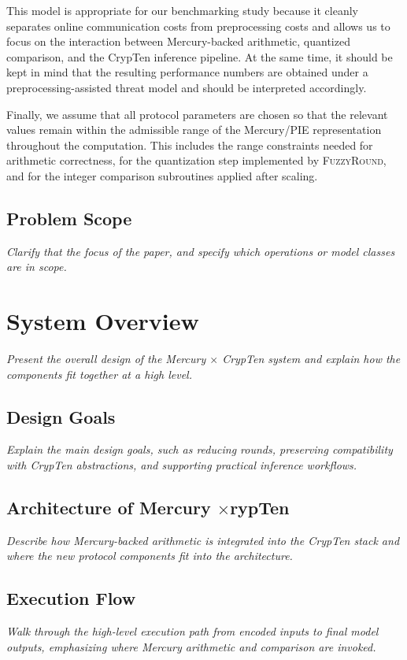 This model is appropriate for our benchmarking study because it cleanly
separates online communication costs from preprocessing costs and
allows us to focus on the interaction between Mercury-backed arithmetic,
quantized comparison, and the CrypTen inference pipeline. At the same
time, it should be kept in mind that the resulting performance numbers
are obtained under a preprocessing-assisted threat model and should be
interpreted accordingly.

Finally, we assume that all protocol parameters are chosen so that the
relevant values remain within the admissible range of the Mercury/PIE
representation throughout the computation. This includes the range
constraints needed for arithmetic correctness, for the quantization
step implemented by \textsc{FuzzyRound}, and for the integer comparison
subroutines applied after scaling.

\subsection{Problem Scope}
\textit{Clarify that the focus of the paper, and specify which operations or model classes are in scope.}

\section{System Overview}
\textit{Present the overall design of the Mercury $\times$ CrypTen system and explain how the components fit together at a high level.}

\subsection{Design Goals}
\textit{Explain the main design goals, such as reducing rounds, preserving compatibility with CrypTen abstractions, and supporting practical inference workflows.}

\subsection{Architecture of Mercury \texorpdfstring{$\times$} CrypTen}
\textit{Describe how Mercury-backed arithmetic is integrated into the CrypTen stack and where the new protocol components fit into the architecture.}

\subsection{Execution Flow}
\textit{Walk through the high-level execution path from encoded inputs to final model outputs, emphasizing where Mercury arithmetic and comparison are invoked.}

